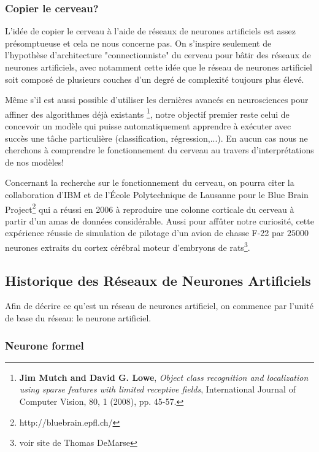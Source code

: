 \subsubsection{Copier le cerveau?}

L'idée de copier le cerveau à l'aide de réseaux de neurones artificiels est
assez présomptueuse et cela ne nous concerne pas. On s'inspire seulement de
l'hypothèse d'architecture "connectionniste" du cerveau pour bâtir des réseaux
de neurones artificiels, avec notamment cette idée que le réseau de neurones
artificiel soit composé de plusieurs couches d'un degré de complexité toujours
plus élevé.

Même s'il est aussi possible d'utiliser les dernières avancés en neurosciences
pour affiner des algorithmes déjà existants \cite{lowe}\footnote{\textbf{Jim
Mutch and David G. Lowe}, \textit{Object class recognition and localization
using sparse features with limited receptive fields}, International Journal of
Computer Vision, 80, 1 (2008), pp. 45-57.}, notre objectif premier reste celui
de concevoir un modèle qui puisse automatiquement apprendre à exécuter avec
succès une tâche particulière (classification, régression,...). En aucun cas
nous ne cherchons à comprendre le fonctionnement du cerveau au travers
d'interprétations de nos modèles!

Concernant la recherche sur le fonctionnement du cerveau, on pourra citer la
collaboration d'IBM et de l'École Polytechnique de Lausanne pour le Blue Brain
Project\footnote{http://bluebrain.epfl.ch/} qui a réussi en 2006 à reproduire
une colonne corticale du cerveau à partir d'un amas de données considérable.
Aussi pour affûter notre curiosité, cette expérience réussie de simulation de
pilotage d'un avion de chasse F-22 par $25 000$ neurones extraits du cortex
cérébral moteur d'embryons de rats\footnote{voir site de Thomas DeMarse}.

\subsection{Historique des Réseaux de Neurones Artificiels}


Afin de décrire ce qu'est un réseau de neurones artificiel, on commence par
l'unité de base du réseau: le neurone artificiel.

\subsubsection{Neurone formel}

